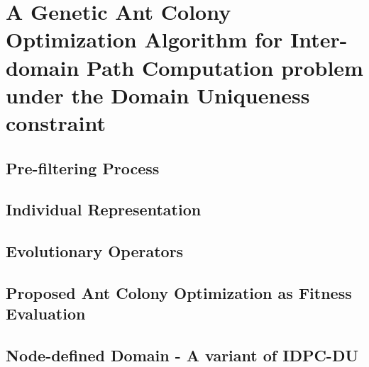 \chapter{A Genetic Ant Colony Optimization Algorithm for Inter-domain Path Computation problem under the Domain Uniqueness constraint}
\label{chap:chap3}

\section{Pre-filtering Process}
\label{proposed:prefiltering}


\section{Individual Representation}
\label{proposed:encoding}


\section{Evolutionary Operators}
\label{proposed:operator}


\section{Proposed Ant Colony Optimization as Fitness Evaluation}
\label{proposed:aco}


\section{Node-defined Domain - A variant of IDPC-DU}
\label{proposed:ndu}
